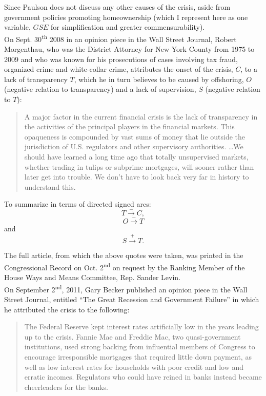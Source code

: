 \documentclass[12pt]{article}
\newcommand{\ts}{\textsuperscript}
\begin{document}
Since Paulson does not discuss any other causes of the crisis, aside from government policies promoting homeownership (which I represent here as one variable, $GSE$ for simplification and greater commensurability).\\

On Sept. 30\ts{th} 2008 in an opinion piece in the Wall Street Journal, Robert Morgenthau, who was the District Attorney for New York County from 1975 to 2009 and who was known for his prosecutions of cases involving tax fraud, organized crime and white-collar crime, attributes the onset of the crisis, $C$, to a lack of transparency $T$, which he in turn believes to be caused by offshoring, $O$ (negative relation to transparency) and a lack of supervision, $S$ (negative relation to $T$):

\begin{quotation}
A major factor in the current financial crisis is the lack of transparency in the activities of the principal players in the financial markets. This opaqueness is compounded by vast sums of money that lie outside the jurisdiction of U.S. regulators and other supervisory authorities. \ldots We should have learned a long time ago that totally unsupervised markets, whether trading in tulips or subprime mortgages, will sooner rather than later get into trouble. We don't have to look back very far in history to understand this.
\end{quotation}
To summarize in terms of directed signed arcs:
$$T \xrightarrow{-} C,$$
$$O \xrightarrow{-} T$$
and
$$S \xrightarrow{+} T.$$

The full article, from which the above quotes were taken, was printed in the Congressional Record on Oct. 2\ts{nd} on request by the Ranking Member of the House Ways and Means Committee, Rep. Sander Levin.\\

On September 2\ts{nd}, 2011, Gary Becker published an opinion piece in the Wall Street Journal, entitled ``The Great Recession and Government Failure'' in which he attributed the crisis to the following:

\begin{quotation}
The Federal Reserve kept interest rates artificially low in the years leading up to the crisis. Fannie Mae and Freddie Mac, two quasi-government institutions, used strong backing from influential members of Congress to encourage irresponsible mortgages that required little down payment, as well as low interest rates for households with poor credit and low and erratic incomes. Regulators who could have reined in banks instead became cheerleaders for the banks.
\end{quotation}
\end{document}
